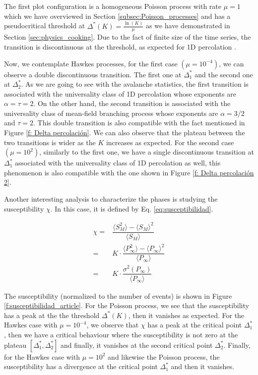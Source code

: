 The first plot configuration is a homogeneous Poisson process with rate $\mu=1$ which we have overviewed in Section \ref{subsec:Poisson_processes} and has a pseudocritical threshold at 
$\Delta^*(K)=\frac{\ln(K)}{\mu}$ as we have demonstrated in Section \ref{sec:physics_cooking}. Due to the fact of finite size of the time series, the transition is discontinuous at 
the threshold, as expected for 1D percolation \cite{stauffer2018introduction}.

Now, we contemplate Hawkes processes, for the first case $\left( \mu=10^{-4} \right)$, we can observe a double discontinuous transition. The first one at $\Delta_1^*$ and the second one at
$\Delta_2^*$. As we are going to see with the avalanche statistics, the first transition is associated with the universality class of 1D percolation whose exponents are $\alpha=\tau=2$. 
On the other hand, the second transition is associated with the universality class of mean-field branching process whose exponents are $\alpha=3/2$ and $\tau=2$. This double transition 
is also compatible with the fact mentioned in Figure \ref{f: Delta percolación}. We can also observe that the plateau between the two transitions is wider as the $K$ increases as expected.
For the second case $\left( \mu=10^2 \right)$, similarly to the first one, we have a single discontinuous transition at $\Delta_1^*$ associated with the universality class of 1D percolation
as well, this phenomenon is also compatible with the one shown in Figure \ref{f: Delta percolación 2}.

Another interesting analysis to characterize the phases is studying the susceptibility $\chi$. In this case, it is defined by Eq. \ref{eq:susceptibilidad}.

\begin{equation}
    \begin{split}
        \chi =& \dfrac{ \langle S_M^2 \rangle - \langle S_M \rangle^2 }{\langle S_M \rangle}\\
             =& K\cdot \dfrac{\langle P_{\infty}^2 \rangle - \langle P_{\infty} \rangle^2}{\langle P_{\infty} \rangle}\\
             =& K\cdot \dfrac{\sigma^2\left( P_\infty \right)}{\langle P_{\infty} \rangle}
    \end{split}
    \label{eq:susceptibilidad}
\end{equation}

The susceptibility (normalized to the number of events) is shown in Figure \ref{f:susceptibilidad_article}. For the Poisson process, we see that the susceptibility has a peak at the
the threshold $\Delta^*(K)$, then it vanishes as expected. For the Hawkes case with $\mu=10^{-4}$, we observe that $\chi$ has a peak at the critical point $\Delta_1^*$, then 
we have a critical behaviour where the susceptibility is not zero at the plateau $[\Delta_1^*,\Delta_2^*]$ and finally, it vanishes at the second critical point $\Delta_2^*$. Finally, 
for the Hawkes case with $\mu=10^2$ and likewise the Poisson process, the susceptibility has a divergence at the critical point $\Delta_1^*$ and then it vanishes. 

